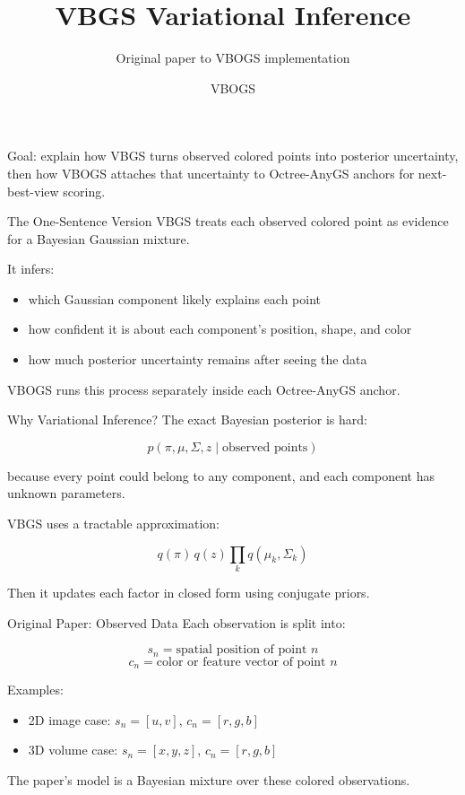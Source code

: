 \documentclass[aspectratio=169]{beamer}
\title{VBGS Variational Inference}
\subtitle{Original paper to VBOGS implementation}
\author{VBOGS}
\date{}
\begin{document}
\begin{frame}
  \titlepage
  \vspace{-0.5em}
  \begin{center}
    \small
    Goal: explain how VBGS turns observed colored points into posterior uncertainty,
    then how VBOGS attaches that uncertainty to Octree-AnyGS anchors for
    next-best-view scoring.
  \end{center}
\end{frame}

\begin{frame}{The One-Sentence Version}
  VBGS treats each observed colored point as evidence for a Bayesian Gaussian mixture.

  \vspace{0.8em}
  It infers:
  \begin{itemize}
    \item which Gaussian component likely explains each point
    \item how confident it is about each component's position, shape, and color
    \item how much posterior uncertainty remains after seeing the data
  \end{itemize}

  \vspace{0.8em}
  VBOGS runs this process separately inside each Octree-AnyGS anchor.
\end{frame}

\begin{frame}{Why Variational Inference?}
  The exact Bayesian posterior is hard:

  \[
    p(\pi, \mu, \Sigma, z \mid \text{observed points})
  \]

  because every point could belong to any component, and each component has
  unknown parameters.

  \vspace{0.8em}
  VBGS uses a tractable approximation:

  \[
    q(\pi)\,q(z)\prod_k q(\mu_k,\Sigma_k)
  \]

  Then it updates each factor in closed form using conjugate priors.
\end{frame}

\begin{frame}{Original Paper: Observed Data}
  Each observation is split into:

  \[
    s_n = \text{spatial position of point } n
  \]
  \[
    c_n = \text{color or feature vector of point } n
  \]

  \vspace{0.8em}
  Examples:

  \begin{itemize}
    \item 2D image case: \(s_n = [u, v]\), \(c_n = [r, g, b]\)
    \item 3D volume case: \(s_n = [x, y, z]\), \(c_n = [r, g, b]\)
  \end{itemize}

  \vspace{0.8em}
  The paper's model is a Bayesian mixture over these colored observations.
\end{frame}
\end{document}

